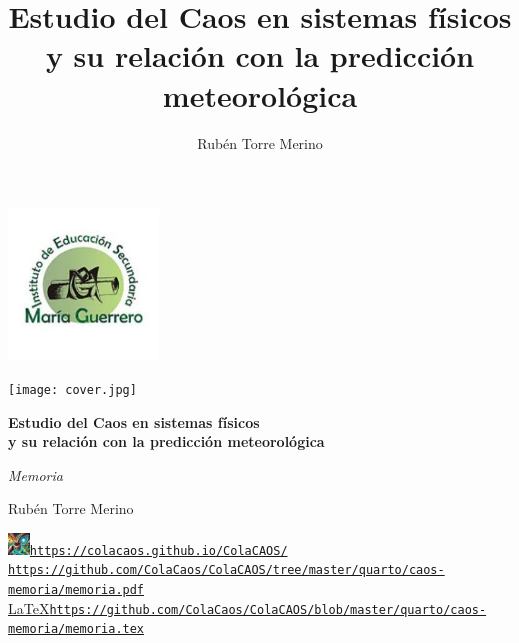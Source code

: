 \documentclass[
  10pt,
  a4paper,
  DIV=11,
  numbers=noendperiod,
  open=any]{scrreprt}
\title{Estudio del Caos en sistemas físicos y su relación con la
predicción meteorológica}
\author{Rubén Torre Merino}
\date{}
\numberwithin{equation}{chapter}
\numberwithin{equation}{section}
\renewcommand{\[}{\begin{equation}}
\renewcommand{\]}{\end{equation}}
\begin{document}
\begin{titlepage}
  \centering
  \vspace*{-1cm}
  \includegraphics[width=4cm]{ies.jpeg}\par
  \vspace{0cm}

  \texttt{[image: cover.jpg]}\par
  \vspace{1.2cm}

  {\Huge\bfseries\color{Main} Estudio del Caos en sistemas físicos\\[2mm]
  y su relación con la predicción meteorológica\par}

  \vspace{0.8cm}
  {\Large\color{gray!90} \textit{Memoria}}\par

  \vspace{0.5cm}
  {\Large Rubén Torre Merino}\par

  \vfill
  \begingroup
  \centering
  \small
  \setlength{\baselineskip}{1.1em}

  \href{https://colacaos.github.io/ColaCAOS/}{\includegraphics[height=1.56em]{favicon.png}\hspace{0.3em}\texttt{https://colacaos.github.io/ColaCAOS/}}\\[0.25cm]

  \href{https://github.com/ColaCaos/ColaCAOS/tree/master/quarto/caos-memoria/memoria.pdf}{{\textcolor{red}{\raisebox{-0.1ex}{\scalebox{1.3}{\faFilePdf}}}}\hspace{0.35em}\texttt{https://github.com/ColaCaos/ColaCAOS/tree/master/quarto/caos-memoria/memoria.pdf}}\\[0.25cm]

  \href{https://github.com/ColaCaos/ColaCAOS/blob/master/quarto/caos-memoria/memoria.tex}{{\LaTeX}\hspace{0.35em}\texttt{https://github.com/ColaCaos/ColaCAOS/blob/master/quarto/caos-memoria/memoria.tex}}\\[0.6cm]


\end{titlepage}
\end{document}
